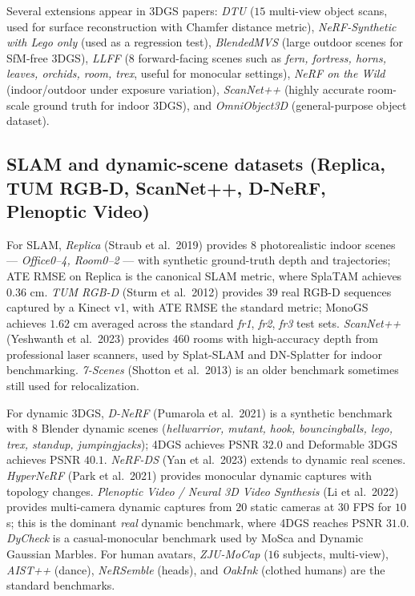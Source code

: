 Several extensions appear in 3DGS papers: \emph{DTU} (\(15\) multi-view object scans, used for surface reconstruction with Chamfer distance metric), \emph{NeRF-Synthetic with Lego only} (used as a regression test), \emph{BlendedMVS} (large outdoor scenes for SfM-free 3DGS), \emph{LLFF} (\(8\) forward-facing scenes such as \emph{fern, fortress, horns, leaves, orchids, room, trex}, useful for monocular settings), \emph{NeRF on the Wild} (indoor/outdoor under exposure variation), \emph{ScanNet++} (highly accurate room-scale ground truth for indoor 3DGS), and \emph{OmniObject3D} (general-purpose object dataset).

\subsection{SLAM and dynamic-scene datasets (Replica, TUM RGB-D, ScanNet++, D-NeRF, Plenoptic Video)}\label{slam-and-dynamic-scene-datasets-replica-tum-rgb-d-scannet-d-nerf-plenoptic-video}

For SLAM, \emph{Replica} (Straub et al.~2019) provides \(8\) photorealistic indoor scenes --- \emph{Office0--4, Room0--2} --- with synthetic ground-truth depth and trajectories; ATE RMSE on Replica is the canonical SLAM metric, where SplaTAM achieves \(0.36\) cm. \emph{TUM RGB-D} (Sturm et al.~2012) provides \(39\) real RGB-D sequences captured by a Kinect v1, with ATE RMSE the standard metric; MonoGS achieves \(1.62\) cm averaged across the standard \emph{fr1}, \emph{fr2}, \emph{fr3} test sets. \emph{ScanNet++} (Yeshwanth et al.~2023) provides \(460\) rooms with high-accuracy depth from professional laser scanners, used by Splat-SLAM and DN-Splatter for indoor benchmarking. \emph{7-Scenes} (Shotton et al.~2013) is an older benchmark sometimes still used for relocalization.

For dynamic 3DGS, \emph{D-NeRF} (Pumarola et al.~2021) is a synthetic benchmark with \(8\) Blender dynamic scenes (\emph{hellwarrior, mutant, hook, bouncingballs, lego, trex, standup, jumpingjacks}); 4DGS achieves PSNR \(32.0\) and Deformable 3DGS achieves PSNR \(40.1\). \emph{NeRF-DS} (Yan et al.~2023) extends to dynamic real scenes. \emph{HyperNeRF} (Park et al.~2021) provides monocular dynamic captures with topology changes. \emph{Plenoptic Video / Neural 3D Video Synthesis} (Li et al.~2022) provides multi-camera dynamic captures from \(20\) static cameras at \(30\) FPS for \(10\) s; this is the dominant \emph{real} dynamic benchmark, where 4DGS reaches PSNR \(31.0\). \emph{DyCheck} is a casual-monocular benchmark used by MoSca and Dynamic Gaussian Marbles. For human avatars, \emph{ZJU-MoCap} (\(16\) subjects, multi-view), \emph{AIST++} (dance), \emph{NeRSemble} (heads), and \emph{OakInk} (clothed humans) are the standard benchmarks.

